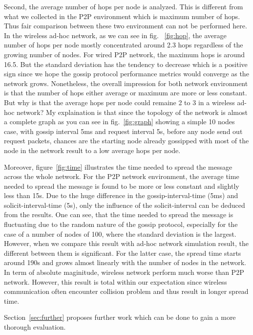 Second, the average number of hops per node is analyzed. This is different from what we collected in the P2P environment which is maximum number of hops. Thus fair comparison between these two environment can not be performed here. In the wireless ad-hoc network, as we can see in fig. ~\ref{fig:hop}, the average number of hops per node mostly concentrated around 2.3 hops regardless of the growing number of nodes. For wired P2P network, the maximum hops is around 16.5. But the standard deviation has the tendency to decrease which is a positive sign since we hope the gossip protocol performance metrics would converge as the network grows. Nonetheless, the overall impression for both network environment is that the number of hops either average or maximum are more or less constant. But why is that the average hops per node could remaine 2 to 3 in a wireless ad-hoc network? My explaination is that since the topology of the network is almost a complete graph as you can see in fig.~\ref{fig:graph} showing a simple 10 nodes case, with gossip interval 5ms and request interval 5s, before any node send out request packets, chances are the starting node already gossipped with most of the node in the network result to a low average hops per node.

%
%

Moreover, figure~\ref{fig:time} illustrates the time needed to spread the message across the whole network. For the P2P network environment, the average time needed to spread the message is found to be more or less constant and slightly less than 15s. Due to the huge difference in the gossip-interval-time (5ms) and solicit-interval-time (5s), only the influence of the solicit-interval can be deduced from the results. One can see, that the time needed to spread the message is fluctuating due to the random nature of the gossip protocol, especially for the case of a number of nodes of 100, where the standard deviation is the largest. However, when we compare this result with ad-hoc network simulation result, the different between them is significant. For the latter case, the spread time starts around 190s and grows almost linearly with the number of nodes in the network. In term of absolute maginitude, wireless network perform much worse than P2P network. However, this result is total within our expectation since wireless communication often encounter collision problem and thus result in longer spread time.


Section~\ref{sec:further} proposes further work which can be done to gain a more thorough evaluation.




